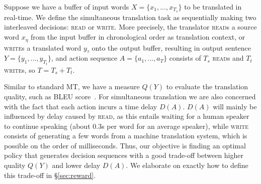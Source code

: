 Suppose we have a buffer of input words $X = \{x_1, ..., x_{T_s}\}$ to be translated in real-time. We define the simultaneous translation task as sequentially making two interleaved decisions: \textsc{read} or \textsc{write}.
More precisely, the translator \textsc{read}s a source word $x_\eta$ from the input buffer in chronological order as translation context, or \textsc{write}s a translated word $y_\tau$ onto the output buffer, resulting in output sentence $Y = \{y_1, ..., y_{T_t}\}$,
and action sequence $A=\{a_1, ..., a_T\}$ consists of $T_s$ \textsc{read}s and $T_t$ \textsc{write}s, so $T=T_s+T_t$.

Similar to standard MT, we have a measure $Q(Y)$ to evaluate the translation quality, such as BLEU score~\cite{papineni2002bleu}.
For simultaneous translation we are also concerned with the fact that each action incurs a time delay $D(A)$.
$D(A)$ will mainly be influenced by delay caused by \textsc{read}, as this entails waiting for a human speaker to continue speaking (about $0.3$s per word for an average speaker), while \textsc{write} consists of generating a few words from a machine translation system, which is possible on the order of milliseconds.
Thus, our objective is finding an optimal policy that generates decision sequences with a good trade-off between higher quality $Q(Y)$ and lower delay $D(A)$.
We elaborate on exactly how to define this trade-off in \S\ref{sec:reward}.



